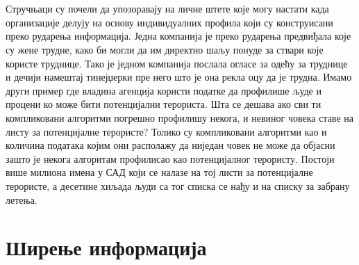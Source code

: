 \documentclass{article}
\begin{document}
\\\\
Стручњаци су почели да упозоравају на личне штете које могу настати када организације делују на основу индивидуалних профила који су конструисани преко рударења информација. Једна компанија је преко рударења предвиђала које су жене трудне, како би могли да им директно шаљу понуде за ствари које користе труднице. Тако је једном компанија послала огласе за одећу за труднице и дечији намештај тинејџерки пре него што је она рекла оцу да је трудна.
Имамо други пример где владина агенција користи податке да профилише људе и процени ко може бити потенцијални терориста. Шта се дешава ако сви ти компликовани алгоритми погрешно профилишу некога, и невиног човека ставе на листу за потенцијалне терористе? Толико су компликовани алгоритми као и количина података којим они располажу да ниједан човек не може да објасни зашто је некога алгоритам профилисао као потенцијалног терористу. Постоји више милиона имена у САД који се налазе на тој листи за потенцијалне терористе, а десетине хиљада људи са тог списка се нађу и на списку за забрану летења.

\newpage
\section{Ширење информација}
\end{document}
